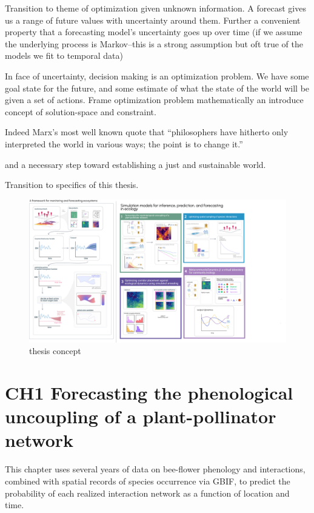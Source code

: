 \documentclass[10pt,oneside]{article}
\makeatletter
\def\maxwidth{\ifdim\Gin@nat@width>\linewidth\linewidth
\else\Gin@nat@width\fi}
\let\Oldincludegraphics\includegraphics
\renewcommand{\includegraphics}[1]{\Oldincludegraphics[width=\maxwidth]{#1}}
\makeatother
\begin{document}
Transition to theme of optimization given unknown information. A
forecast gives us a range of future values with uncertainty around them.
Further a convenient property that a forecasting model's uncertainty
goes up over time (if we assume the underlying process is Markov--this
is a strong assumption but oft true of the models we fit to temporal
data)

In face of uncertainty, decision making is an optimization problem. We
have some goal state for the future, and some estimate of what the state
of the world will be given a set of actions. Frame optimization problem
mathematically an introduce concept of solution-space and constraint.

Indeed Marx's most well known quote that ``philosophers have hitherto
only interpreted the world in various ways; the point is to change it.''

and a necessary step toward establishing a just and sustainable world.

Transition to specifics of this thesis.

\begin{figure}
\centering
\includegraphics{./figures/thesisconcept.png}
\caption{thesis concept}
\end{figure}

\hypertarget{ch1-forecasting-the-phenological-uncoupling-of-a-plant-pollinator-network}{%
\section{CH1 Forecasting the phenological uncoupling of a
plant-pollinator
network}\label{ch1-forecasting-the-phenological-uncoupling-of-a-plant-pollinator-network}}

This chapter uses several years of data on bee-flower phenology and
interactions, combined with spatial records of species occurrence via
GBIF, to predict the probability of each realized interaction network as
a function of location and time.
\end{document}
